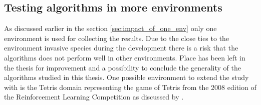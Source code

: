 \subsection{Testing algorithms in more environments }
As discussed earlier in the section \ref{sec:impact_of_one_env} only one environment is used for collecting the results. Due to the close ties to the environment invasive species during the development there is a risk that the algorithms does not perform well in other environments. Place has been left in the thesis for improvement and a possibility to conclude the generality of the algorithms studied in this thesis. One possible environment to extend the study with is the Tetris domain representing the game of Tetris from the 2008 edition of the Reinforcement Learning Competition as discussed by \textcite{whiteson2010reinforcement}.  
